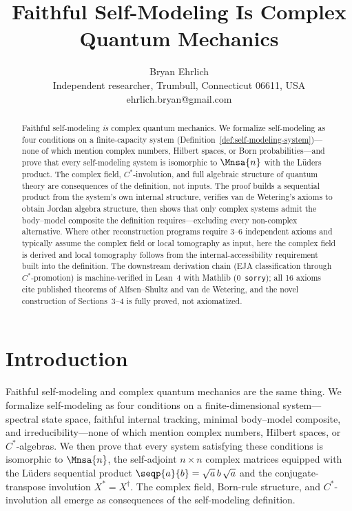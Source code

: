\documentclass[11pt]{article}
\title{Faithful Self-Modeling Is Complex Quantum Mechanics}
\author{Bryan Ehrlich\\[4pt]
  \normalsize Independent researcher, Trumbull, Connecticut 06611, USA\\
  \normalsize ehrlich.bryan@gmail.com}
\date{}
\begin{document}
\maketitle

\begin{abstract}
Faithful self-modeling \emph{is} complex quantum mechanics.  We
formalize self-modeling as four conditions on a finite-capacity
system (Definition~\ref{def:self-modeling-system})---none of which
mention complex numbers, Hilbert spaces, or Born probabilities---and
prove that every self-modeling system is isomorphic to $\Mnsa{n}$
with the L\"uders product.  The complex field, $C^{*}$-involution,
and full algebraic structure of quantum theory are consequences of
the definition, not inputs.  The proof builds a sequential product
from the system's own internal structure, verifies van de
Wetering's axioms to obtain Jordan algebra structure, then shows
that only complex systems admit the body--model composite the
definition requires---excluding every non-complex alternative.
Where other reconstruction programs require 3--6 independent axioms
and typically assume the complex field or local tomography as input,
here the complex field is derived and local tomography follows from
the internal-accessibility requirement built into the definition.  The downstream derivation chain (EJA classification through
$C^{*}$-promotion) is machine-verified in Lean~4 with Mathlib
(0~\texttt{sorry}); all 16 axioms cite published theorems of
Alfsen--Shultz and van de Wetering, and the novel construction of
Sections~3--4 is fully proved, not axiomatized.
\end{abstract}


\section{Introduction}
\label{sec:intro}

Faithful self-modeling and complex quantum mechanics are the same
thing.  We formalize self-modeling as four conditions on a
finite-dimensional system---spectral state space, faithful internal
tracking, minimal body--model composite, and irreducibility---none
of which mention complex numbers, Hilbert spaces, or $C^{*}$-algebras.
We then prove that every system satisfying these conditions is
isomorphic to $\Mnsa{n}$, the self-adjoint $n \times n$ complex
matrices equipped with the L\"uders sequential product
$\seqp{a}{b} = \sqrt{a}\, b\, \sqrt{a}$ and the conjugate-transpose
involution $X^{*} = X^{\dagger}$.  The complex field, Born-rule
structure, and $C^{*}$-involution all emerge as consequences of the
self-modeling definition.
\end{document}
